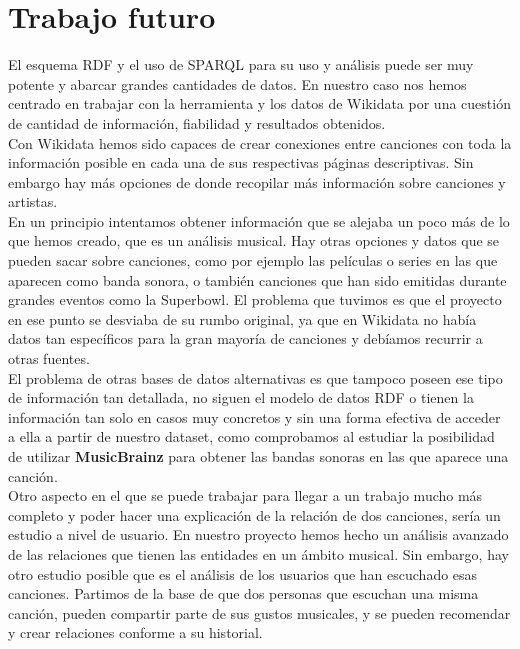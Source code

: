 \section{Trabajo futuro}

El esquema RDF y el uso de SPARQL para su uso y análisis puede ser muy potente y abarcar grandes cantidades de datos. En nuestro caso nos hemos centrado en trabajar con la herramienta y los datos de Wikidata por una cuestión de cantidad de información, fiabilidad y resultados obtenidos.\\

Con Wikidata hemos sido capaces de crear conexiones entre canciones con toda la información posible en cada una de sus respectivas páginas descriptivas. Sin embargo hay más opciones de donde recopilar más información sobre canciones y artistas.\\ 

En un principio intentamos obtener información que se alejaba un poco más de lo que hemos creado, que es un análisis musical. Hay otras opciones y datos que se pueden sacar sobre canciones, como por ejemplo las películas o series en las que aparecen como banda sonora, o también canciones que han sido emitidas durante grandes eventos como la Superbowl. El problema que tuvimos es que el proyecto en ese punto se desviaba de su rumbo original, ya que en Wikidata no había datos tan específicos para la gran mayoría de canciones y debíamos recurrir a otras fuentes.\\

El problema de otras bases de datos alternativas es que tampoco poseen ese tipo de información tan detallada, no siguen el modelo de datos RDF o tienen la información tan solo en casos muy concretos y sin una forma efectiva de acceder a ella a partir de nuestro dataset, como comprobamos al estudiar la posibilidad de utilizar \textbf{MusicBrainz} \cite{musicbrainz} para obtener las bandas sonoras en las que aparece una canción.\\

Otro aspecto en el que se puede trabajar para llegar a un trabajo mucho más completo y poder hacer una explicación de la relación de dos canciones, sería un estudio a nivel de usuario.
En nuestro proyecto hemos hecho un análisis avanzado de las relaciones que tienen las entidades en un ámbito musical. Sin embargo, hay otro estudio posible que es el análisis de los usuarios que han escuchado esas canciones. Partimos de la base de que dos personas que escuchan una misma canción, pueden compartir parte de sus gustos musicales, y se pueden recomendar y crear relaciones conforme a su historial.\\

